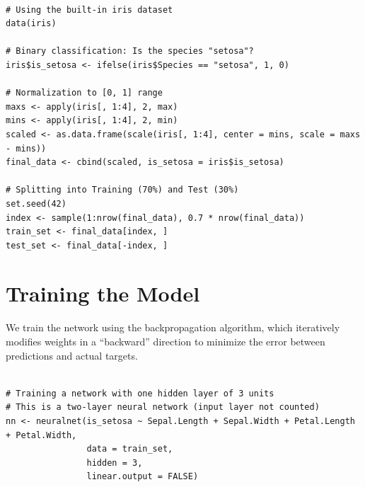 \documentclass{article}
\begin{document}
\begin{listing}[H]
    \begin{verbatim}

# Using the built-in iris dataset
data(iris)

# Binary classification: Is the species "setosa"?
iris$is_setosa <- ifelse(iris$Species == "setosa", 1, 0)

# Normalization to [0, 1] range
maxs <- apply(iris[, 1:4], 2, max)
mins <- apply(iris[, 1:4], 2, min)
scaled <- as.data.frame(scale(iris[, 1:4], center = mins, scale = maxs - mins))
final_data <- cbind(scaled, is_setosa = iris$is_setosa)

# Splitting into Training (70%) and Test (30%)
set.seed(42)
index <- sample(1:nrow(final_data), 0.7 * nrow(final_data))
train_set <- final_data[index, ]
test_set <- final_data[-index, ]

    \end{verbatim}
    \caption{Data preprocessing and partitioning. This listing covers loading the Iris dataset, performing range normalization (scaling inputs from 0 to 1), and splitting the data into training (70\%) and testing (30\%) subsets.}
\end{listing}



\section{Training the Model}
We train the network using the backpropagation algorithm, which iteratively modifies weights in a ``backward'' direction to minimize the error between predictions and actual targets.

\begin{listing}[H]
    \begin{verbatim}

# Training a network with one hidden layer of 3 units
# This is a two-layer neural network (input layer not counted)
nn <- neuralnet(is_setosa ~ Sepal.Length + Sepal.Width + Petal.Length + Petal.Width,
                data = train_set,
                hidden = 3,
                linear.output = FALSE)

    \end{verbatim}
    \caption{Training the multilayer feed-forward neural network. The code demonstrates training a model with one hidden layer of three units using the backpropagation algorithm to minimize prediction error.}
\end{listing}
\end{document}

